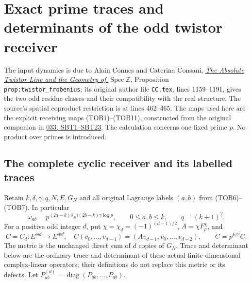 \section{Exact prime traces and determinants of the odd twistor receiver}
\label{sec:twistor-prime-trace}

The input dynamics is due to Alain Connes and Caterina Consani,
\href{https://arxiv.org/abs/2609.00299v1}{\emph{The Absolute Twistor Line
and the Geometry of $\overline{\operatorname{Spec}\mathbb Z}$}},
Proposition \texttt{prop:twistor\_frobenius}; its original author file
\texttt{CC.tex}, lines 1159--1191, gives the two odd residue classes
and their compatibility with the real structure. The source's spatial
coproduct restriction is at lines 462--465. The maps used here are the
explicit receiving maps (TOB1)--(TOB11), constructed from the original
companion in
\href{https://github.com/KokunoYumeto/zeta-function-research-reader/blob/3c78cfbd9e194d35117b33277c421c6564ce3dbf/workbenches/splitzero-tandem/continuations/20260923-full-prime-support/033/MIXED_PRIME_ENERGY_AND_BOUNDARY.tex}{033,
SBT1--SBT23}. The calculation concerns one fixed prime $p$. No product
over primes is introduced.

\subsection{The complete cyclic receiver and its labelled traces}

Retain $k,\delta,\gamma,q,N,E,G_N$ and all original Lagrange labels
$(a,b)$ from (TOB6)--(TOB7). In particular
\begin{equation}\tag{TPT1}
 \omega_{ab}=p^{(2a-k)\delta}e^{i(2b-k)\gamma\log p},
 \qquad 0\le a,b\le k,\qquad q=(k+1)^2.
\end{equation}
For a positive odd integer $d$, put $\chi=\chi_d=(-1)^{(d-1)/2}$,
$A=\chi F_p^\chi$, and
\begin{equation}\tag{TPT2}
 C=C_d:E^{\oplus d}\longrightarrow E^{\oplus d},\quad
 C(v_0,\ldots,v_{d-1})=(Av_{d-1},v_0,\ldots,v_{d-2}),
 \qquad \widetilde C=p^{k/2}C.
\end{equation}
The metric is the unchanged direct sum of $d$ copies of $G_N$.
Trace and determinant below are the ordinary trace and determinant
of these actual finite-dimensional complex-linear operators; their
definitions do not replace this metric or its defects.
Let $P_{ab}^{(d)}=\operatorname{diag}(P_{ab},\ldots,P_{ab})$.

